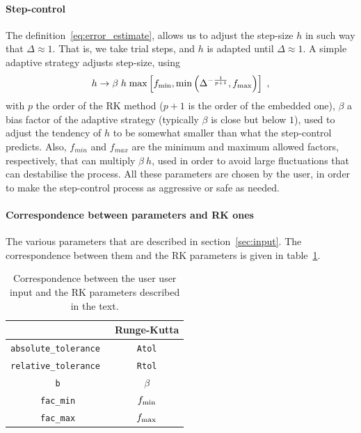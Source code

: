\documentclass[11pt,a4paper]{article}
\begin{document}
\paragraph{Step-control} The definition~\ref{eq:error_estimate}, allows us to adjust the step-size $h$ in such way that $\Delta \approx 1$. That is, we take trial steps, and $h$ is adapted until $\Delta \approx 1$.  A simple adaptive strategy adjusts step-size, using
%
\begin{eqnarray}
	h \to \beta \; h \;  {\rm max} \left[ f_{\rm min}, {\rm min} \left( \Delta^{-\frac{1}{p+1}}, f_{\rm max} \right) \right] \;,
	\label{eq:step-control}
\end{eqnarray}
%
with $p$ the order of the RK method ($p+1$ is the order of the embedded one), $\beta$  a bias factor of the adaptive strategy (typically $\beta$ is close but below $1$), used to adjust the tendency of $h$ to be somewhat smaller than what the step-control predicts. Also, $f_{min}$ and $f_{max}$ are the minimum and maximum allowed factors, respectively, that can multiply $\beta \ h$, used in order to avoid large fluctuations that can destabilise the process. All these parameters are chosen by the user, in order to make the step-control process as aggressive or safe as needed. 

\paragraph{Correspondence between \mimes parameters and RK ones}
%
The various parameters that \mimes are described in section~\ref{sec:input}. The correspondence between them and the RK parameters is given in table~\ref{tab:RK_mimes_params}.
%
\begin{table}[t!]
	\centering
	\begin{tabular}{|c|c|}
		\mimes & Runge-Kutta \\
		\hline
		{\tt absolute\_tolerance } & {\tt Atol}  \\
		\hline
		{\tt relative\_tolerance } & {\tt Rtol}  \\
		\hline
		{\tt b} & $\beta$  \\
		\hline
		{\tt fac\_min} & $f_{\rm min}$  \\
		\hline
		{\tt fac\_max} & $f_{\rm max}$  \\
		\hline
	\end{tabular}
	\caption{Correspondence between the user \mimes user input and the RK parameters described in the text.}
	\label{tab:RK_mimes_params}
\end{table}
\end{document}
